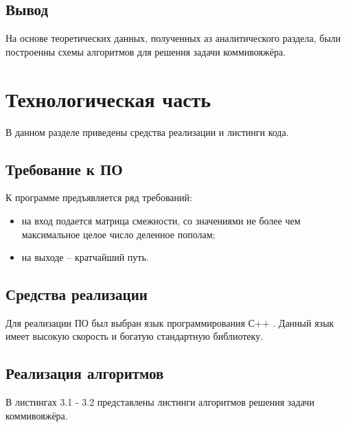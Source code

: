 \documentclass[12pt]{report}
\begin{document}
\section*{Вывод}
	
На основе теоретических данных, полученных аз аналитического раздела, были построенны схемы алгоритмов для решения задачи коммивояжёра.
	
\chapter{Технологическая часть}
	
В данном разделе приведены средства реализации и листинги кода.
	
\section{Требование к ПО}
	
К программе предъявляется ряд требований:
	
\begin{itemize}
	\item на вход подается матрица смежности, со значениями не более чем максимальное целое число деленное пополам;
	\item на выходе -- кратчайший путь.
\end{itemize}
	
\section{Средства реализации}
	
Для реализации ПО был выбран язык программирования С++ \cite{cpp}. Данный язык имеет высокую скорость и
богатую стандартную библиотеку.
	
\section{Реализация алгоритмов}

В листингах 3.1 - 3.2 представлены листинги алгоритмов решения задачи коммивояжёра.
	
\end{document}
